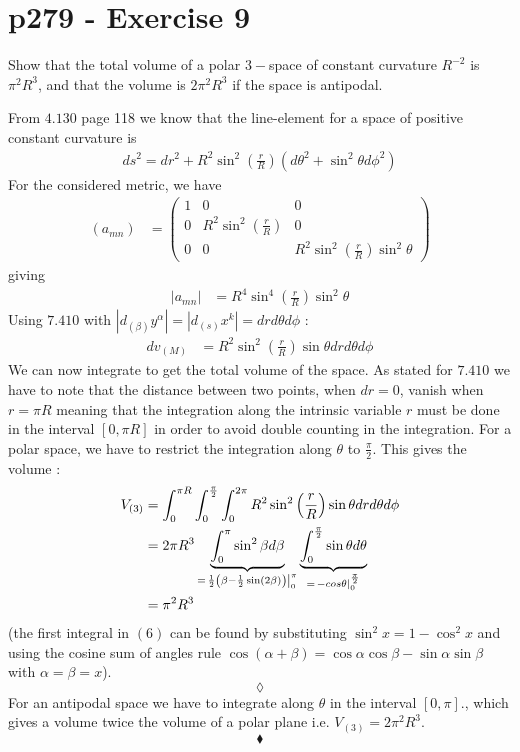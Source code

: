 \section{p279 - Exercise 9}
\begin{tcolorbox}
Show that the total volume of a polar $3-$space of constant curvature $R^{-2}$ is $\pi^2R^3$, and that the volume is $2\pi^2R^3$ if the space is antipodal.
\end{tcolorbox}
From $\mathbf{4.130}$ page 118 we know that the line-element for a space of positive constant curvature is 
\begin{align}
ds^2=dr^2+R^2\sin^2 \left( \frac{r}{R}\right)\left(d\theta^2+\sin^2\theta d\phi^2\right)
\end{align}
For the considered metric, we have
\begin{align}
\left(a_{mn}\right)&= \left(\begin{array}{llll}
1&0&0\\
0&R^2\sin^2 \left( \frac{r}{R}\right)&0\\
0&0&R^2\sin^2 \left( \frac{r}{R}\right)\sin^2\theta
\end{array}\right)
\end{align}
giving 
\begin{align}
\left|a_{mn}\right| &= R^4\sin^4\left( \frac{r}{R}\right)\sin^2\theta
\end{align}
Using $\mathbf{7.410}$ with $\left|d_{(\beta )}y^{\alpha}\right|=\left|d_{(s )}x^k\right| =  dr d\theta d\phi$ :
\begin{align}
dv_{(M)}&=R^2\sin^2\left( \frac{r}{R}\right)\sin\theta dr d\theta d\phi
\end{align}
We can now integrate to get the total volume of the space. As stated for $\mathbf{7.410}$ we have to note that the distance between two points, when $dr=0$, vanish when $r=\pi R$ meaning that the integration along the intrinsic variable $r$ must be done in the interval $\left[0,\pi R\right]$ in order to avoid double counting in the integration.
For a polar space, we have to restrict the integration along $\theta$ to $\frac{\pi}{2}$. This gives the volume :
\begin{align}
V_{(3)}&= \int_{0}^{\pi R}\int_{0}^{\frac{\pi}{2}}\int_{0}^{2\pi}R^2\sin^2\left( \frac{r}{R}\right)\sin\theta dr d\theta d\phi\\
&= 2 \pi R^3  \underbrace{\int_{0}^{\pi}\sin^2 \beta d\beta}_{=\left.\frac{1}{2}\left(\beta-\frac{1}{2}\sin (2 \beta)\right)\right|_0^{\pi}}\underbrace{\int_{0}^{\frac{\pi}{2}}\sin\theta d\theta}_{=\left. -cos\theta\right|_0^{\frac{\pi}{2}}}\\
&=\pi^2 R^3  
\end{align}
(the first integral in $(6)$ can be found by substituting $\sin^2 x = 1-\cos^2 x$ and  using the cosine sum of angles rule $\cos\left(\alpha+\beta\right) = \cos\alpha\cos\beta-\sin\alpha\sin\beta$ with $\alpha = \beta=x$).
$$\lozenge$$
For an antipodal space we have to integrate along $\theta$ in the interval $\left[0,\pi \right]$., which gives a volume twice the volume of a polar plane i.e. $V_{(3)}= 2\pi^2 R^3$.
$$\blacklozenge$$
\newpage

